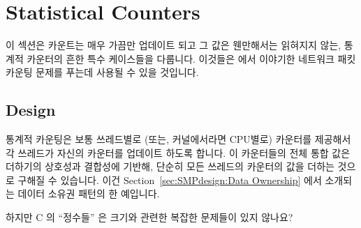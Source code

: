 \section{Statistical Counters}
\label{sec:count:Statistical Counters}

이 섹션은 카운트는 매우 가끔만 업데이트 되고 그 값은 웬만해서는 읽혀지지 않는,
통계적 카운터의 흔한 특수 케이스들을 다룹니다.
이것들은 {\QQstatcnt} 에서 이야기한 네트워크 패킷 카운팅 문제를 푸는데 사용될
수 있을 것입니다.

\subsection{Design}

통계적 카운팅은 보통 쓰레드별로 (또는, 커널에서라면 CPU별로) 카운터를 제공해서
각 쓰레드가 자신의 카운터를 업데이트 하도록 합니다.
이 카운터들의 전체 통합 값은 더하기의 상호성과 결합성에 기반해, 단순히 모든
쓰레드의 카운터의 값을 더하는 것으로 구해질 수 있습니다.
이건 Section~\ref{sec:SMPdesign:Data Ownership} 에서 소개되는 데이터 소유권
패턴의 한 예입니다.

\QuickQuiz{}
	하지만 C 의 ``정수들'' 은 크기와 관련한 복잡한 문제들이 있지 않나요?
	\iffalse

